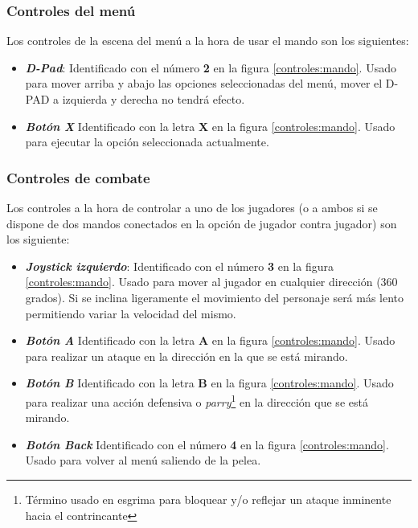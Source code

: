 \subsubsection{Controles del menú}

Los controles de la escena del menú a la hora de usar el mando son los siguientes:

\begin{itemize}
	\item \textbf{\textit{D-Pad}}: Identificado con el número \textbf{2} en la figura \ref{controles:mando}. Usado para mover arriba y abajo las opciones seleccionadas del menú, mover el D-PAD a izquierda y derecha no tendrá efecto.
	\item \textbf{\textit{Botón X}} Identificado con la letra \textbf{X} en la figura \ref{controles:mando}. Usado para ejecutar la opción seleccionada actualmente.
\end{itemize}

\subsubsection{Controles de combate}

Los controles a la hora de controlar a uno de los jugadores (o a ambos si se dispone de dos mandos conectados en la opción de jugador contra jugador) son los siguiente:

\begin{itemize}
	\item \textbf{\textit{Joystick izquierdo}}: Identificado con el número \textbf{3} en la figura \ref{controles:mando}. Usado para mover al jugador en cualquier dirección (360 grados). Si se inclina ligeramente el movimiento del personaje será más lento permitiendo variar la velocidad del mismo.
	\item \textbf{\textit{Botón A}} Identificado con la letra \textbf{A} en la figura \ref{controles:mando}. Usado para realizar un ataque en la dirección en la que se está mirando.
	\item \textbf{\textit{Botón B}} Identificado con la letra \textbf{B} en la figura \ref{controles:mando}. Usado para realizar una acción defensiva o \textit{parry}\footnote{Término usado en esgrima para bloquear y/o reflejar un ataque inminente hacia el contrincante} en la dirección que se está mirando.
	\item \textbf{\textit{Botón Back}} Identificado con el número \textbf{4} en la figura \ref{controles:mando}. Usado para volver al menú saliendo de la pelea.
\end{itemize}

